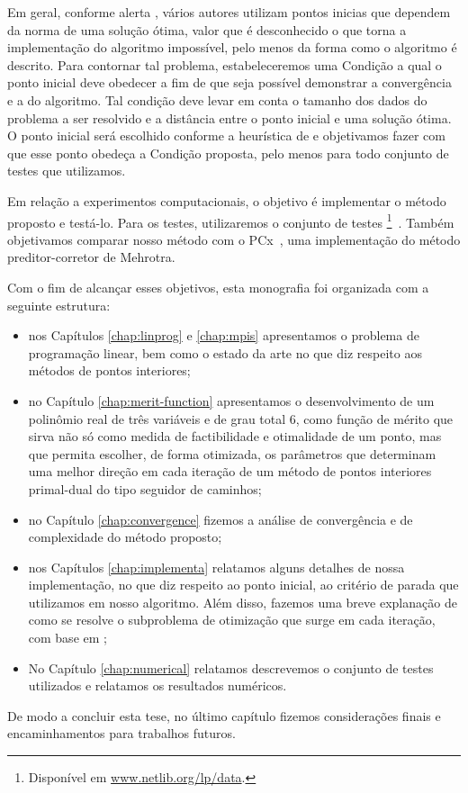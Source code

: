 Em geral, conforme alerta \textcite[p. 112]{Wright:Primal-dual-interior-point:1997h}, vários autores utilizam pontos inicias que dependem da norma de uma solução ótima, valor que é desconhecido o que torna a implementação do algoritmo impossível, pelo menos da forma como o algoritmo é descrito.  
 Para contornar tal problema,  estabeleceremos uma Condição a qual o ponto inicial deve obedecer a fim de que seja possível demonstrar a convergência e a  do algoritmo. Tal condição deve levar  em conta o tamanho dos dados do problema a  ser  resolvido e a distância entre o ponto inicial e uma solução ótima.  O ponto inicial será escolhido conforme a heurística de \textcite{Mehrotra:1992wr} e objetivamos fazer com que esse ponto obedeça a Condição proposta, pelo menos para todo conjunto de testes que utilizamos. 



Em relação a experimentos computacionais, o objetivo é implementar o método proposto e testá-lo. Para os testes, utilizaremos o conjunto de testes \Netlib\footnote{Disponível em \url{www.netlib.org/lp/data}.}~\cite{Dongarra:1987jk,Gay:1985ts}. Também objetivamos comparar nosso método com o PCx~\cite{Czyzyk:1999hk}, uma implementação do método preditor-corretor de Mehrotra. 



Com o fim de alcançar  esses objetivos, esta monografia foi organizada com a seguinte estrutura: 

\begin{itemize}

	\item nos Capítulos \ref{chap:linprog} e  \ref{chap:mpis} apresentamos o problema de programação linear, bem como o estado da arte no que diz respeito aos métodos de pontos interiores; 
\item no Capítulo \ref{chap:merit-function} apresentamos o
desenvolvimento de um polinômio real de três variáveis e de grau total 6, como função de mérito  que sirva não só como medida
de factibilidade e otimalidade de um ponto, mas que permita escolher, de forma
otimizada, os parâmetros que determinam uma melhor direção em cada iteração
de um método de pontos interiores primal-dual do tipo seguidor de caminhos; 
\item no Capítulo \ref{chap:convergence} fizemos a análise de convergência e de complexidade do método proposto; 
\item nos Capítulos \ref{chap:implementa}  relatamos alguns detalhes de nossa implementação, no que diz respeito  ao ponto inicial, ao critério de parada que utilizamos em nosso algoritmo. Além disso, fazemos uma breve explanação de como se resolve o subproblema de otimização que surge em cada iteração, com base em \cite{VillasBoas2013:wn,VillasBoas:2003tg,VillasBoas:2012ur};

\item No Capítulo  \ref{chap:numerical} relatamos descrevemos o conjunto de testes utilizados e relatamos os resultados  numéricos.


\end{itemize}

 De modo a  concluir esta tese, no último capítulo fizemos considerações finais e encaminhamentos para trabalhos futuros.


